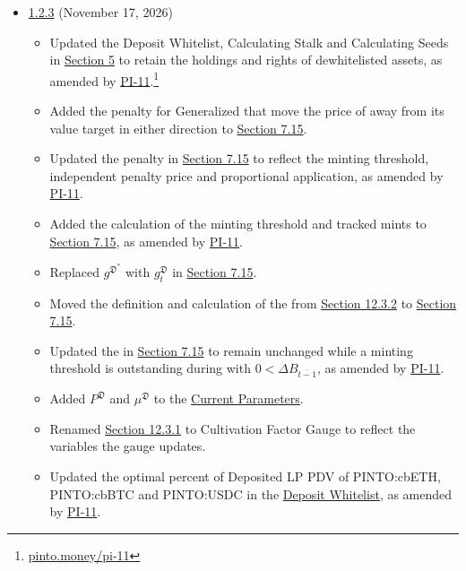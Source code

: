 \documentclass[class=article, crop=false]{standalone}
\begin{document}
\begin{itemize}[topsep=0pt, itemsep=3pt,leftmargin=16pt]
    \item \href{https://github.com/pinto-org/whitepaper/blob/main/version-history/pinto1_2_3.pdf}{1.2.3} (November 17, 2026)
    \begin{itemize}
        \setlength{\emergencystretch}{1em}
        \item Updated the Deposit Whitelist, Calculating Stalk and Calculating Seeds in \hyperlink{section.5}{Section 5} to retain the holdings and rights of dewhitelisted assets, as amended by \href{https://pinto.money/pi-11}{PI-11}.\footnote{\href{https://pinto.money/pi-11}{pinto.money/pi-11}}
        \item Added the  penalty for Generalized  that move the price of  away from its value target in either direction to \hyperref[sec:mown-stalk-penalty]{Section 7.15}.
        \item Updated the  penalty in \hyperref[sec:mown-stalk-penalty]{Section 7.15} to reflect the minting threshold, independent penalty price and proportional application, as amended by \href{https://pinto.money/pi-11}{PI-11}.
        \item Added the calculation of the minting threshold and tracked mints to \hyperref[sec:mown-stalk-penalty]{Section 7.15}, as amended by \href{https://pinto.money/pi-11}{PI-11}.
        \item Replaced $g^{\mathfrak{D}^{*}}$ with $g_t^{\mathfrak{D}}$ in \hyperref[sec:mown-stalk-penalty]{Section 7.15}.
        \item Moved the definition and calculation of the  from \href{https://github.com/pinto-org/whitepaper/blob/master/version-history/pinto1_2_2.pdf}{Section 12.3.2} to \hyperref[sec:mown-stalk-penalty]{Section 7.15}.
        \item Updated the  in \hyperref[sec:mown-stalk-penalty]{Section 7.15} to remain unchanged while a minting threshold is outstanding during  with $0<\Delta B_{\overline{t-1}}$, as amended by \href{https://pinto.money/pi-11}{PI-11}.
        \item Added $P^{\mathfrak{D}}$ and $\mu^{\mathfrak{D}}$ to the \hyperlink{subsection.12.1}{Current Parameters}.
        \item Renamed \hyperlink{subsubsection.12.3.1}{Section 12.3.1} to Cultivation Factor Gauge to reflect the variables the gauge updates.
        \item Updated the optimal percent of Deposited LP PDV of PINTO:cbETH, PINTO:cbBTC and PINTO:USDC in the \hyperlink{subsection.12.9}{Deposit Whitelist}, as amended by \href{https://pinto.money/pi-11}{PI-11}.

\end{itemize}
\end{itemize}
\end{document}

